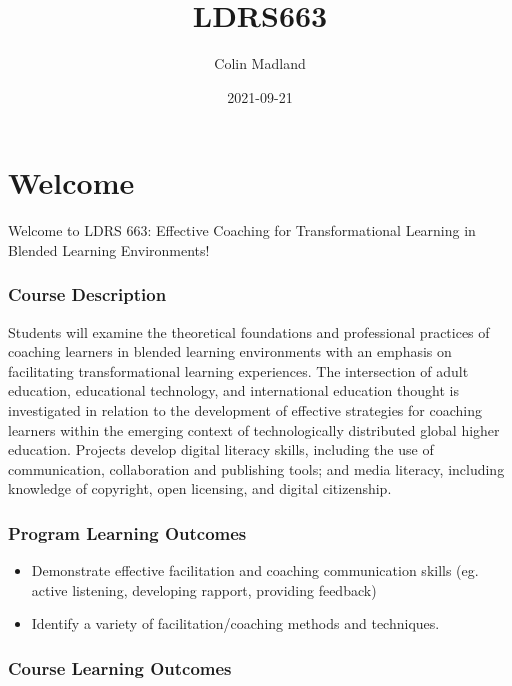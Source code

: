 \documentclass[
]{book}
\title{LDRS663}
\author{Colin Madland}
\date{2021-09-21}
\providecommand{\tightlist}{%
  \setlength{\itemsep}{0pt}\setlength{\parskip}{0pt}}
\begin{document}
\maketitle

{
\setcounter{tocdepth}{1}
\tableofcontents
}
\hypertarget{welcome}{%
\chapter{Welcome}\label{welcome}}

Welcome to LDRS 663: Effective Coaching for Transformational Learning in Blended Learning Environments!

\hypertarget{course-description}{%
\subsection{Course Description}\label{course-description}}

Students will examine the theoretical foundations and professional practices of coaching learners in blended learning environments with an emphasis on facilitating transformational learning experiences. The intersection of adult education, educational technology, and international education thought is investigated in relation to the development of effective strategies for coaching learners within the emerging context of technologically distributed global higher education. Projects develop digital literacy skills, including the use of communication, collaboration and publishing tools; and media literacy, including knowledge of copyright, open licensing, and digital citizenship.

\hypertarget{program-learning-outcomes}{%
\subsection{Program Learning Outcomes}\label{program-learning-outcomes}}

\begin{itemize}
\tightlist
\item
  Demonstrate effective facilitation and coaching communication skills (eg. active listening, developing rapport, providing feedback)\\
\item
  Identify a variety of facilitation/coaching methods and techniques.
\end{itemize}

\hypertarget{course-learning-outcomes}{%
\subsection{Course Learning Outcomes}\label{course-learning-outcomes}}
\end{document}

